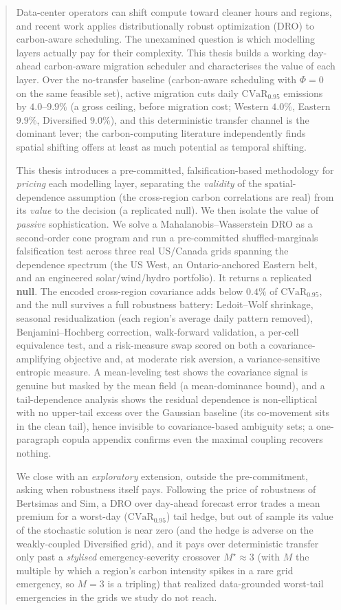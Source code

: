 \documentclass[12pt]{article}
\newcommand{\CVaR}{\mathrm{CVaR}}
\begin{document}
\begin{abstract}
\noindent Data-center operators can shift compute toward cleaner hours and regions,
and recent work applies distributionally robust optimization (DRO) to carbon-aware
scheduling. The unexamined question is which modelling layers actually pay for their
complexity. This thesis builds a working day-ahead carbon-aware migration scheduler
and characterises the value of each layer. Over the no-transfer baseline (carbon-aware
scheduling with $\Phi=0$ on the same feasible set), active migration cuts daily
$\CVaR_{0.95}$ emissions by $4.0$--$9.9\%$ (a gross ceiling, before migration cost; Western
$4.0\%$, Eastern $9.9\%$, Diversified $9.0\%$), and this deterministic transfer channel is the
dominant lever; the carbon-computing literature independently finds spatial shifting offers at
least as much potential as temporal shifting.

This thesis introduces a pre-committed,
falsification-based methodology for \emph{pricing} each modelling layer, separating the
\emph{validity} of the spatial-dependence assumption (the cross-region carbon
correlations are real) from its \emph{value} to the decision (a replicated null). We
then isolate the value of \emph{passive} sophistication. We solve a Mahalanobis--Wasserstein
DRO as a second-order cone program and run a pre-committed shuffled-marginals falsification
test across three real US/Canada grids spanning the dependence spectrum (the US West, an
Ontario-anchored Eastern belt, and an engineered solar/wind/hydro portfolio). It returns a
replicated \textbf{null}. The encoded cross-region covariance adds
below $0.4\%$ of $\CVaR_{0.95}$, and the null survives a full robustness battery:
Ledoit--Wolf shrinkage, seasonal residualization (each region's average daily pattern
removed), Benjamini--Hochberg correction, walk-forward validation, a per-cell equivalence
test, and a risk-measure swap scored on both a covariance-amplifying objective and, at
moderate risk aversion, a variance-sensitive entropic measure. A mean-leveling
test shows the covariance signal is genuine but masked by the mean
field (a mean-dominance bound), and a tail-dependence analysis shows the residual
dependence is non-elliptical with no upper-tail excess over the Gaussian baseline (its
co-movement sits in the clean tail), hence invisible to covariance-based ambiguity sets; a one-paragraph copula appendix confirms even the
maximal coupling recovers nothing.

We close with an \emph{exploratory} extension, outside the pre-commitment, asking when
robustness itself pays. Following the price of robustness of Bertsimas and Sim, a DRO over day-ahead forecast
error trades a mean premium for a worst-day ($\CVaR_{0.95}$) tail hedge, but out of sample
its value of the stochastic solution is near zero (and the hedge is adverse on the
weakly-coupled Diversified grid), and it pays over deterministic transfer only past
a \emph{stylised} emergency-severity crossover $M^\star\approx3$ (with $M$ the multiple by which a
region's carbon intensity spikes in a rare grid emergency, so $M=3$ is a tripling) that
realized data-grounded worst-tail emergencies in the grids we study do not reach.


\end{abstract}
\end{document}
